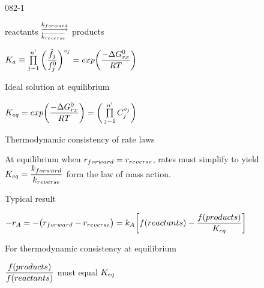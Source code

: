 \begin{mitframe}{082-1}
    
\begin{listone}
	\item reactants $^{\underrightarrow{\thermcond_{forward}}}_{\overleftarrow{\thermcond_{reverse}}}$ products
    \item $\eqconst\equiv\prod\limits_{j-1}^{n'}\bigg(\dfrac{\hat{\fug_j}}{\fug^0_j}\bigg)^{\vvel_j}=exp\bigg(\dfrac{-\iipf\gibbs_{\pos\disp}^0}{\gasconst\Temp}\bigg)$
        \begin{listtwo}
        	\item Ideal solution at equilibrium
            	\begin{listthree}
                	\item $\dilfac_{eq}=exp\bigg(\dfrac{-\iipf\gibbs_{\pos\disp}^0}{\gasconst\Temp}\bigg)=\bigg(\prod\limits_{j-1}^{n'}\conc_j^{\vvel_j}\bigg)$
                 \end{listthree}
        	\item Thermodynamic consistency of rate laws
            		\begin{listthree}
                    	\item At equilibrium when $\pos_{forward}=\pos_{reverse}$, rates must simplify to yield\\  $\dilfac_{eq}=\dfrac{\thermcond_{forward}}{\thermcond_{reverse}}$ form the law of mass action.
                        \item Typical result
                        	\begin{listfour}
                            	\item $-\pos_{\helmholtz}=-\big(\pos_{forward}-\pos_{reverse}\big)=\thermcond_{\helmholtz}\bigg[\fug(reactants)-\dfrac{\fug(products)}{\dilfac_{eq}}\bigg]$
                                \begin{listfive}
                                	\item For thermodynamic consistency at equilibrium
                               		\begin{listsix}
                                 		\item $\dfrac{\fug(products)}{\fug(reactants)}$ must equal $\dilfac_{eq}$
									\end{listsix}   
                                \end{listfive}
                            \end{listfour}                 
                    \end{listthree}
        \end{listtwo} 
\end{listone}
\end{mitframe}